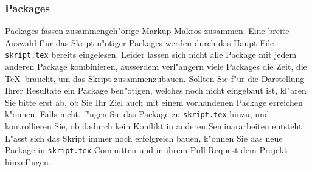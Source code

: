 \documentclass[a4paper,12pt]{article}
\begin{document}

\subsubsection{Packages}
Packages fassen zusammengeh"orige Markup-Makros zusammen.
Eine breite Auswahl f"ur das Skript n"otiger Packages werden durch
das Haupt-File \texttt{skript.tex} bereits eingelesen.
Leider lassen sich nicht alle Package mit jedem anderen Package
kombinieren, ausserdem verl"angern viele Packages die Zeit, die
\TeX\ braucht, um das Skript zusammenzubauen.
Sollten Sie f"ur die Darstellung Ihrer Resultate ein Package ben"otigen,
welches noch nicht eingebaut ist, kl"aren Sie bitte erst ab, ob Sie
Ihr Ziel auch mit einem vorhandenen Package erreichen k"onnen.
Falls nicht, f"ugen Sie das Package zu \texttt{skript.tex} hinzu,
und kontrollieren Sie, ob dadurch kein Konflikt in anderen Seminararbeiten
entsteht.
L"asst sich das Skript immer noch erfolgreich bauen, k"onnen Sie das
neue Package in \texttt{skript.tex} Committen und in ihrem Pull-Request
dem Projekt hinzuf"ugen.
\end{document}

